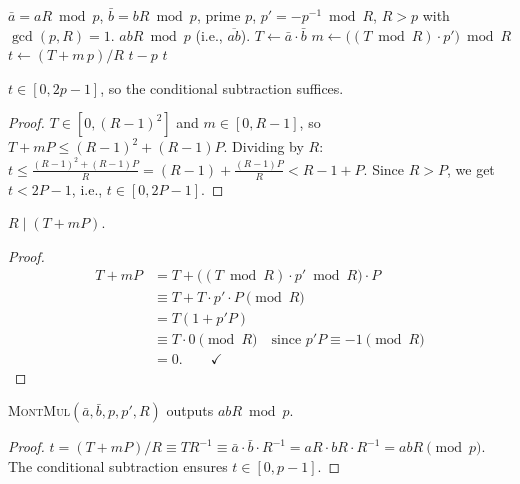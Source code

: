 \documentclass[11pt]{article}
\begin{document}
\begin{algorithm}
\caption{$\textsc{MontMul}(\bar{a},\,\bar{b},\,p,\,p',\,R)$}
\begin{algorithmic}[1]
\Require $\bar{a} = aR \bmod p$, $\bar{b} = bR \bmod p$,
         prime $p$, $p' = -p^{-1} \bmod R$, $R > p$ with $\gcd(p,R)=1$.
\Ensure $abR \bmod p$ (i.e., $\overline{ab}$).
\State $T \leftarrow \bar{a} \cdot \bar{b}$
\State $m \leftarrow \bigl((T \bmod R)\cdot p'\bigr) \bmod R$
\State $t \leftarrow (T + m\,p) / R$
  \State \Return $t - p$
\Else
  \State \Return $t$
\EndIf
\end{algorithmic}
\end{algorithm}

\begin{claim}
  $t \in [0, 2p-1]$, so the conditional subtraction suffices.
\end{claim}
\begin{proof}
  $T \in [0, (R-1)^2]$ and $m \in [0, R-1]$, so
  $T + mP \leq (R-1)^2 + (R-1)P$.  Dividing by $R$:
  $t \leq \frac{(R-1)^2 + (R-1)P}{R} = (R-1) + \frac{(R-1)P}{R} < R - 1 + P$.
  Since $R > P$, we get $t < 2P - 1$, i.e., $t \in [0, 2P-1]$.
\end{proof}

\begin{claim}
  \label{claim:divisible}
  $R \mid (T + mP)$.
\end{claim}
\begin{proof}
  \begin{align*}
    T + mP
    &= T + \bigl((T \bmod R)\cdot p' \bmod R\bigr)\cdot P \\
    &\equiv T + T \cdot p' \cdot P \pmod{R} \\
    &= T(1 + p'P) \\
    &\equiv T \cdot 0 \pmod{R}
      \quad \text{since } p'P \equiv -1 \pmod{R} \\
    &= 0. \qquad \checkmark
  \end{align*}
\end{proof}

\begin{claim}
  \textsc{MontMul}$(\bar{a},\bar{b},p,p',R)$ outputs $abR \bmod p$.
\end{claim}
\begin{proof}
  $t = (T + mP)/R \equiv TR^{-1} \equiv \bar{a}\cdot\bar{b}\cdot R^{-1}
  = aR \cdot bR \cdot R^{-1} = abR \pmod{p}$.
  The conditional subtraction ensures $t \in [0,p-1]$.
\end{proof}
\end{document}
